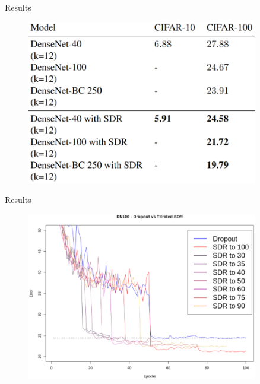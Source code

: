 \documentclass{beamer}
\begin{document}
\begin{frame}{Results}
\begin{figure}[h]
\includegraphics[width=0.9\textwidth]{img/results}
\end{figure}
\end{frame}
\begin{frame}{Results}
\begin{figure}[h]
\includegraphics[width=0.9\textwidth]{img/titrated}
\end{figure}
\end{frame}
\end{document}
